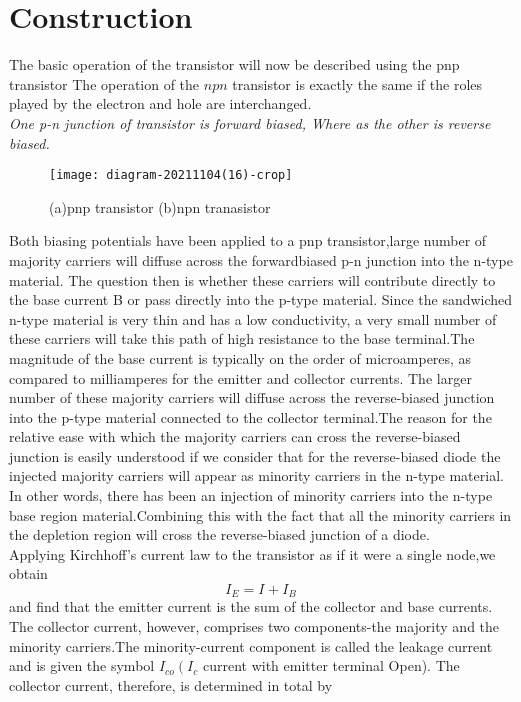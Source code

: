 \section{Construction}
The basic operation of the transistor will now be described using the pnp transistor  The operation of the $n p n$ transistor is exactly the same if the roles played by the electron and hole are interchanged.\\
\textit{One p-n junction of transistor is forward biased, Where as the other is reverse biased.} \\
\begin{figure}[H]
	\centering
	\texttt{[image: diagram-20211104(16)-crop]}
	\caption{(a)pnp transistor (b)npn tranasistor}
	\label{}
\end{figure}
Both biasing potentials have been applied to a pnp transistor,large number of majority carriers will diffuse across the forwardbiased p-n junction into the n-type material. The question then is whether these carriers will contribute directly to the base current B or pass directly into the p-type material. Since the sandwiched n-type material is very thin and has a low conductivity, a very small number of these carriers will take this path of high resistance to the base terminal.The magnitude of the
base current is typically on the order of microamperes, as compared to milliamperes for the emitter and collector currents. The larger number of these majority carriers will diffuse across the reverse-biased junction into the p-type material connected to the collector terminal.The reason for the relative ease with which the majority carriers can cross the reverse-biased junction is easily understood if we consider that for the reverse-biased diode the injected majority carriers will appear as minority carriers in the n-type material. In other words, there has been an injection of minority carriers into the n-type base region material.Combining this with the fact that all the minority carriers in the depletion region will cross the
reverse-biased junction of a diode.\\
Applying Kirchhoff's current law to the transistor  as if it were a single node,we obtain
$$I_{E}=I_{}+I_{B}$$
and find that the emitter current is the sum of the collector and base currents.\\
 The collector current, however, comprises two components-the majority and the minority carriers.The minority-current component is called the leakage current and is given the symbol $I_{co}\left(I_{c}\right.$ current with emitter terminal Open). The collector current, therefore, is determined in total by
